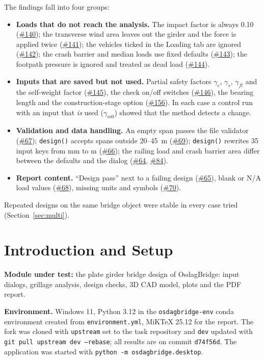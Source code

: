 \documentclass[10pt,a4paper]{article}
\newcommand{\gh}[1]{\href{https://github.com/Nidhikhare12/OsdagBridge/issues/#1}{\##1}}
\newcommand{\issPF}{\gh{145}}   %
\newcommand{\issCS}{\gh{146}}   %
\newcommand{\issBL}{\gh{156}}   %
\begin{document}
The findings fall into four groups:
\begin{itemize}[nosep]
\item \textbf{Loads that do not reach the analysis.} The impact factor is always 0.10 (\gh{140}); the transverse wind area leaves out the girder and the force is applied twice (\gh{141}); the vehicles ticked in the Loading tab are ignored (\gh{142}); the crash barrier and median loads use fixed defaults (\gh{143}); the footpath pressure is ignored and treated as dead load (\gh{144}).
\item \textbf{Inputs that are saved but not used.} Partial safety factors $\gamma_c$, $\gamma_s$, $\gamma_{fl}$ and the self-weight factor (\issPF), the check on/off switches (\issCS), the bearing length and the construction-stage option (\issBL). In each case a control run with an input that \emph{is} used ($\gamma_{m0}$) showed that the method detects a change.
\item \textbf{Validation and data handling.} An empty span passes the file validator (\gh{67}); \texttt{design()} accepts spans outside 20--45~m (\gh{69}); \texttt{design()} rewrites 35 input keys from mm to m (\gh{66}); the railing load and crash barrier area differ between the defaults and the dialog (\gh{64}, \gh{84}).
\item \textbf{Report content.} ``Design pass'' next to a failing design (\gh{65}), blank or N/A load values (\gh{68}), missing units and symbols (\gh{70}).
\end{itemize}
Repeated designs on the same bridge object were stable in every case tried (Section~\ref{sec:multi}).

\tableofcontents
\newpage

\section{Introduction and Setup}
\textbf{Module under test:} the plate girder bridge design of OsdagBridge: input dialogs, grillage analysis, design checks, 3D CAD model, plots and the PDF report.

\textbf{Environment.} Windows 11, Python 3.12 in the \texttt{osdagbridge-env} conda environment created from \texttt{environment.yml}, MiKTeX 25.12 for the report. The fork was cloned with \texttt{upstream} set to the task repository and \texttt{dev} updated with \texttt{git pull upstream dev --rebase}; all results are on commit \texttt{d74f56d}. The application was started with \texttt{python -m osdagbridge.desktop}.
\end{document}
